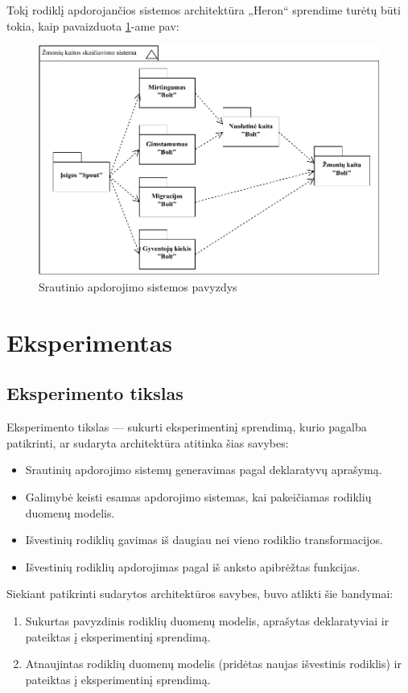 \documentclass{VUMIFPSbakalaurinis}
\begin{document}
\pagebreak
Tokį rodiklį apdorojančios sistemos architektūra „Heron“ sprendime turėtų būti tokia, kaip pavaizduota \ref{img:example}-ame pav:
\begin{figure}[H]
    \centering
    \includegraphics[width=1\textwidth]{img/generuota_sistema.pdf}
    \caption{Srautinio apdorojimo sistemos pavyzdys}
    \label{img:example}
\end{figure}

\section{Eksperimentas}

\subsection{Eksperimento tikslas}

Eksperimento tikslas — sukurti eksperimentinį sprendimą, kurio pagalba patikrinti, ar sudaryta architektūra atitinka šias savybes:
\begin{itemize}
    \item Srautinių apdorojimo sistemų generavimas pagal deklaratyvų aprašymą.
    \item Galimybė keisti esamas apdorojimo sistemas, kai pakeičiamas rodiklių duomenų modelis.
    \item Išvestinių rodiklių gavimas iš daugiau nei vieno rodiklio transformacijos.
    \item Išvestinių rodiklių apdorojimas pagal iš anksto apibrėžtas funkcijas.
\end{itemize}  

\noindent Siekiant patikrinti sudarytos architektūros savybes, buvo atlikti šie bandymai:
\begin{enumerate}
    \item Sukurtas pavyzdinis rodiklių duomenų modelis, aprašytas deklaratyviai ir pateiktas į eksperimentinį sprendimą.
    \item Atnaujintas rodiklių duomenų modelis (pridėtas naujas išvestinis rodiklis) ir pateiktas į eksperimentinį sprendimą.
\end{enumerate}
\end{document}

